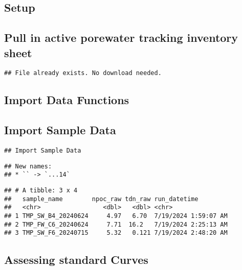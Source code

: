 \documentclass[
]{article}
\begin{document}
\hypertarget{setup}{%
\subsection{Setup}\label{setup}}

\hypertarget{pull-in-active-porewater-tracking-inventory-sheet}{%
\subsection{Pull in active porewater tracking inventory
sheet}\label{pull-in-active-porewater-tracking-inventory-sheet}}

\begin{verbatim}
## File already exists. No download needed.
\end{verbatim}

\newpage

\hypertarget{import-data-functions}{%
\subsection{Import Data Functions}\label{import-data-functions}}

\hypertarget{import-sample-data}{%
\subsection{Import Sample Data}\label{import-sample-data}}

\begin{verbatim}
## Import Sample Data
\end{verbatim}

\begin{verbatim}
## New names:
## * `` -> `...14`
\end{verbatim}

\begin{verbatim}
## # A tibble: 3 x 4
##   sample_name        npoc_raw tdn_raw run_datetime        
##   <chr>                 <dbl>   <dbl> <chr>               
## 1 TMP_SW_B4_20240624     4.97   6.70  7/19/2024 1:59:07 AM
## 2 TMP_FW_C6_20240624     7.71  16.2   7/19/2024 2:25:13 AM
## 3 TMP_SW_F6_20240715     5.32   0.121 7/19/2024 2:48:20 AM
\end{verbatim}

\newpage

\hypertarget{assessing-standard-curves}{%
\subsection{Assessing standard Curves}\label{assessing-standard-curves}}
\end{document}
